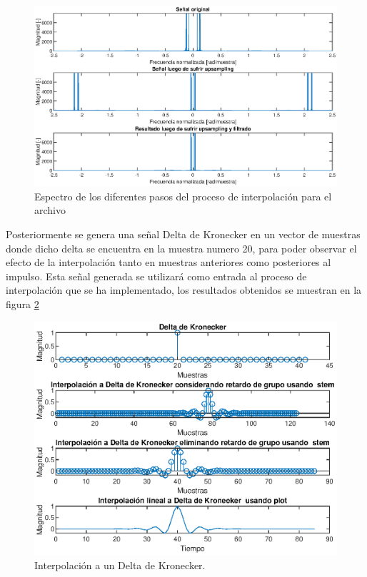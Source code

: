\begin{enumerate}
    
\begin{figure}[H]
    \centering
    \includegraphics[scale = 0.6]{Figuras/p5_1_espectros.eps}
    \caption{Espectro de los diferentes pasos del proceso de interpolación para el archivo }
    \label{espectro_inter}
\end{figure}
    
    
    
Posteriormente se genera una señal Delta de Kronecker en  un vector de muestras donde dicho delta se encuentra en la muestra numero 20,  para poder observar el efecto de la interpolación tanto en muestras anteriores como posteriores al impulso. Esta señal generada se utilizará como entrada al proceso de interpolación que se ha implementado, los resultados obtenidos se muestran en la figura \ref{kroneker}

\begin{figure}[H]
    \centering
    \includegraphics[scale =1]{Figuras/p5_1_kronecker.eps}
    \caption{Interpolación a un Delta de Kronecker.}
    \label{kroneker}
\end{figure}


\end{enumerate}
